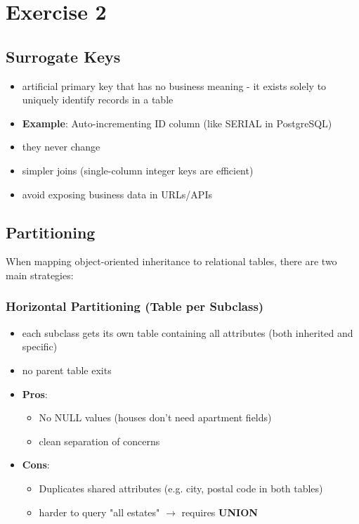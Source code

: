 \chapter{Exercise 2}

\section{Surrogate Keys}
\begin{itemize}
	\item artificial primary key that has no business meaning - it exists solely to uniquely identify records in a table
	\item \textbf{Example}: Auto-incrementing ID column (like SERIAL in PostgreSQL)
	\item they never change
	\item simpler joins (single-column integer keys are efficient)
	\item avoid exposing business data in URLs/APIs	
\end{itemize}

\section{Partitioning}
When mapping object-oriented inheritance to relational tables, there are two main strategies: 

\subsection{Horizontal Partitioning (Table per Subclass)}
\begin{itemize}
	\item each subclass gets its own table containing all attributes (both inherited and specific)
	\item no parent table exits
	\item \textbf{Pros}:
	\begin{itemize}
		\item No NULL values (houses don't need apartment fields)
		\item clean separation of concerns
	\end{itemize}
	\item \textbf{Cons}:
	\begin{itemize}
		\item Duplicates shared attributes (e.g. city, postal code in both tables)
		\item harder to query "all estates" $\rightarrow$ requires \textbf{UNION}
	\end{itemize}
\end{itemize}

